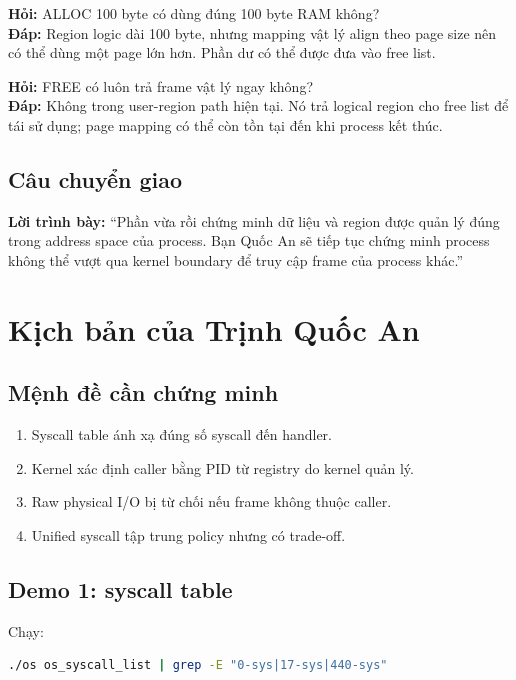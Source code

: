 \documentclass[12pt,a4paper]{article}
\newcommand{\say}[1]{\textbf{\color{bkblue}Lời trình bày:} ``#1''}
\begin{document}
\textbf{Hỏi:} ALLOC 100 byte có dùng đúng 100 byte RAM không?\\
\textbf{Đáp:} Region logic dài 100 byte, nhưng mapping vật lý align theo page
size nên có thể dùng một page lớn hơn. Phần dư có thể được đưa vào free list.

\textbf{Hỏi:} FREE có luôn trả frame vật lý ngay không?\\
\textbf{Đáp:} Không trong user-region path hiện tại. Nó trả logical region cho
free list để tái sử dụng; page mapping có thể còn tồn tại đến khi process kết
thúc.

\subsection{Câu chuyển giao}

\say{Phần vừa rồi chứng minh dữ liệu và region được quản lý đúng trong address
space của process. Bạn Quốc An sẽ tiếp tục chứng minh process không thể vượt
qua kernel boundary để truy cập frame của process khác.}

\section{Kịch bản của Trịnh Quốc An}

\subsection{Mệnh đề cần chứng minh}

\begin{enumerate}
  \item Syscall table ánh xạ đúng số syscall đến handler.
  \item Kernel xác định caller bằng PID từ registry do kernel quản lý.
  \item Raw physical I/O bị từ chối nếu frame không thuộc caller.
  \item Unified syscall tập trung policy nhưng có trade-off.
\end{enumerate}

\subsection{Demo 1: syscall table}

Chạy:

\begin{lstlisting}[language=bash]
./os os_syscall_list | grep -E "0-sys|17-sys|440-sys"
\end{lstlisting}
\end{document}
